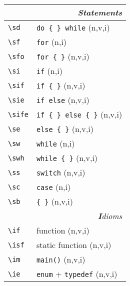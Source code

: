 \documentclass[oneside,11pt,landscape,DIV16]{scrartcl}
\begin{document}
\begin{multicols}{3}
\begin{center}
%
%
\begin{tabular}[]{|p{11mm}|p{60mm}|}
\hline
\multicolumn{2}{|r|}{\textsl{\textbf{S}tatements}} \\
\hline \verb'\sd'  & \verb'do { } while'        \hfill (n,v,i)\\
\hline \verb'\sf'  & \verb'for'                 \hfill (n,i)\\
\hline \verb'\sfo' & \verb'for { }'             \hfill (n,v,i)\\
\hline \verb'\si'  & \verb'if'                  \hfill (n,i)\\
\hline \verb'\sif' & \verb'if { }'              \hfill (n,v,i)\\
\hline \verb'\sie' & \verb'if else'             \hfill (n,v,i)\\
\hline \verb'\sife'& \verb'if { } else { }'     \hfill (n,v,i)\\
\hline \verb'\se'  & \verb'else { }'            \hfill (n,v,i)\\
\hline \verb'\sw'  & \verb'while'               \hfill (n,i)\\
\hline \verb'\swh' & \verb'while { }'           \hfill (n,v,i)\\
\hline \verb'\ss'  & \verb'switch'              \hfill (n,v,i)\\
\hline \verb'\sc'  & \verb'case'                \hfill (n,i)\\
\hline \verb'\sb'  & \verb'{ }'                 \hfill (n,v,i)\\
\hline
\hline
\multicolumn{2}{|r|}{\textsl{\textbf{I}dioms}}   \\
\hline \verb'\if'  & function                           \hfill (n,v,i)\\
\hline \verb'\isf' & static function                    \hfill (n,v,i)\\
\hline \verb'\im'  & \verb'main()'                      \hfill (n,v,i)\\
\hline \verb'\ie'  & \verb'enum'   + \verb'typedef'     \hfill (n,v,i)\\

\end{tabular}
\end{center}
\end{multicols}
\end{document}
